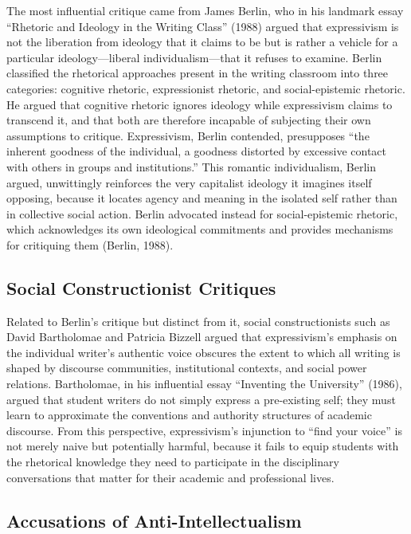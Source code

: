 \documentclass[12pt]{article}
\begin{document}
The most influential critique came from James Berlin, who in his landmark essay ``Rhetoric and Ideology in the Writing Class'' (1988) argued that expressivism is not the liberation from ideology that it claims to be but is rather a vehicle for a particular ideology---liberal individualism---that it refuses to examine. Berlin classified the rhetorical approaches present in the writing classroom into three categories: cognitive rhetoric, expressionist rhetoric, and social-epistemic rhetoric. He argued that cognitive rhetoric ignores ideology while expressivism claims to transcend it, and that both are therefore incapable of subjecting their own assumptions to critique. Expressivism, Berlin contended, presupposes ``the inherent goodness of the individual, a goodness distorted by excessive contact with others in groups and institutions.'' This romantic individualism, Berlin argued, unwittingly reinforces the very capitalist ideology it imagines itself opposing, because it locates agency and meaning in the isolated self rather than in collective social action. Berlin advocated instead for social-epistemic rhetoric, which acknowledges its own ideological commitments and provides mechanisms for critiquing them (Berlin, 1988).

\subsection{Social Constructionist Critiques}

Related to Berlin's critique but distinct from it, social constructionists such as David Bartholomae and Patricia Bizzell argued that expressivism's emphasis on the individual writer's authentic voice obscures the extent to which all writing is shaped by discourse communities, institutional contexts, and social power relations. Bartholomae, in his influential essay ``Inventing the University'' (1986), argued that student writers do not simply express a pre-existing self; they must learn to approximate the conventions and authority structures of academic discourse. From this perspective, expressivism's injunction to ``find your voice'' is not merely naive but potentially harmful, because it fails to equip students with the rhetorical knowledge they need to participate in the disciplinary conversations that matter for their academic and professional lives.

\subsection{Accusations of Anti-Intellectualism}
\end{document}
